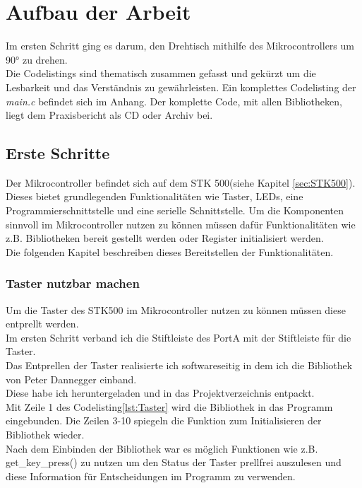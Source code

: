 \chapter{Aufbau der Arbeit}
\label{sec:AufbauDerArbeit}
Im ersten Schritt ging es darum, den Drehtisch mithilfe des Mikrocontrollers um 90° zu drehen.\\
Die Codelistings sind thematisch zusammen gefasst und gekürzt um die Lesbarkeit und das Verständnis zu gewährleisten.
Ein komplettes Codelisting der \textit{main.c} befindet sich im Anhang. Der komplette Code, mit allen Bibliotheken, liegt dem Praxisbericht als CD oder Archiv bei. 

\section{Erste Schritte}
Der Mikrocontroller befindet sich auf dem STK 500(siehe Kapitel \ref{sec:STK500}). Dieses bietet grundlegenden Funktionalitäten wie Taster, LEDs, eine Programmierschnittstelle und eine serielle Schnittstelle.
Um die Komponenten sinnvoll im Mikrocontroller nutzen zu können müssen dafür Funktionalitäten wie z.B. Bibliotheken bereit gestellt werden oder Register initialisiert werden.\\
Die folgenden Kapitel beschreiben dieses Bereitstellen der Funktionalitäten.
\subsection{Taster nutzbar machen}
\label{sec:Taster}
Um die Taster des STK500 im Mikrocontroller nutzen zu können müssen diese entprellt werden.\\
Im ersten Schritt verband ich die Stiftleiste des PortA mit der Stiftleiste für die Taster.\\
Das Entprellen der Taster realisierte ich softwareseitig in dem ich die Bibliothek\cite{uC:Dannegger} von Peter Dannegger einband.\\
Diese habe ich heruntergeladen und in das Projektverzeichnis entpackt.\\
Mit Zeile 1 des Codelisting\ref{lst:Taster} wird die Bibliothek in das Programm eingebunden. Die Zeilen 3-10 spiegeln die Funktion zum Initialisieren der Bibliothek wieder.\\
Nach dem Einbinden der Bibliothek war es möglich Funktionen wie z.B. get\_key\_press() zu nutzen um den Status der Taster prellfrei auszulesen und diese Information für Entscheidungen im Programm zu verwenden.
\lstset{language=C, basicstyle=\footnotesize, showstringspaces=false, tabsize=8}


